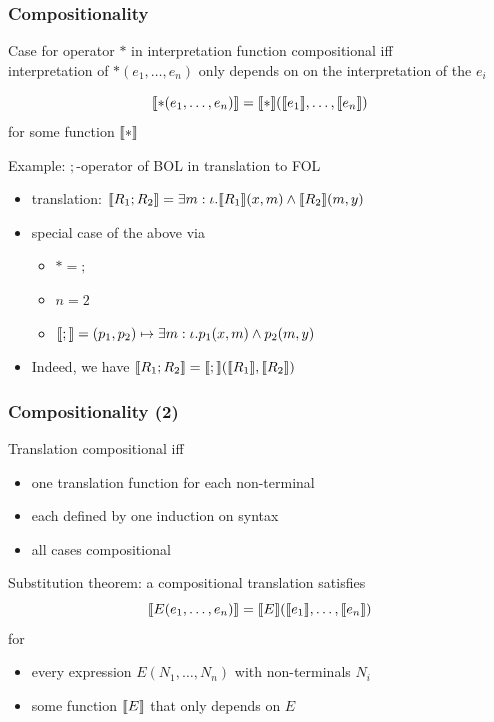 \documentclass{beamer}
\begin{document}
\begin{frame}\frametitle{Compositionality}
Case for operator $*$ in interpretation function compositional iff \\
interpretation of $*(e_1,\ldots,e_n)$ only depends on on the interpretation of the $e_i$

\[\llbracket *(e_1,\ldots,e_n)\rrbracket=\llbracket *\rrbracket(\llbracket e_1\rrbracket,\ldots,\llbracket e_n\rrbracket)\]
for some function $\llbracket *\rrbracket$
\bigskip

Example: $;$-operator of BOL in translation to FOL
\begin{itemize}
 \item translation: $\llbracket R_1 ; R_2\rrbracket= \exists m:\iota.\llbracket R_1\rrbracket(x,m)\wedge \llbracket R_2\rrbracket(m,y)$
 \item special case of the above via
  \begin{itemize}
  \item $*=;$
  \item $n=2$
  \item $\llbracket ;\rrbracket=(p_1,p_2)\mapsto \exists m:\iota.p_1(x,m)\wedge p_2(m,y)$
  \end{itemize}
 \item Indeed, we have $\llbracket R_1;R_2\rrbracket=\llbracket ;\rrbracket(\llbracket R_1\rrbracket,\llbracket R_2\rrbracket)$
\end{itemize}
\end{frame}


\begin{frame}\frametitle{Compositionality (2)}
Translation compositional iff
\begin{itemize}
\item one translation function for each non-terminal
\item each defined by one induction on syntax
\item all cases compositional
\end{itemize}
\bigskip

Substitution theorem: a compositional translation satisfies
\[\llbracket E(e_1,\ldots,e_n)\rrbracket=\llbracket E\rrbracket(\llbracket e_1\rrbracket,\ldots,\llbracket e_n\rrbracket)\]
for
\begin{itemize}
\item every expression $E(N_1,\ldots,N_n)$ with non-terminals $N_i$
\item some function $\llbracket E\rrbracket$ that only depends on $E$
\end{itemize}
\end{frame}
\end{document}
